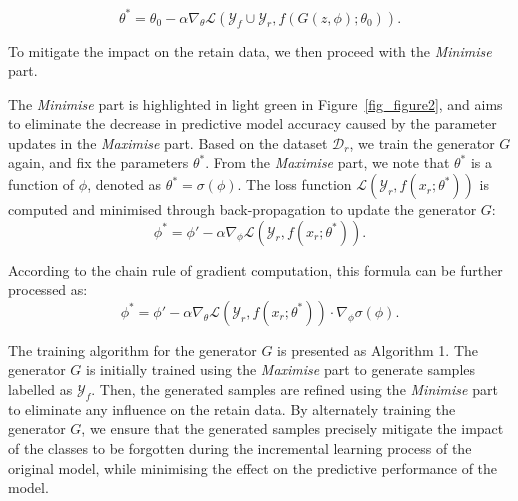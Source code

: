 \documentclass[preprint,12pt]{elsarticle}
\begin{document}
\begin{equation}
\theta^* = \theta_0 - \alpha \nabla_\theta \mathcal{L}(\mathcal{Y}_f \cup \mathcal{Y}_r, f(G(z, \phi); \theta_0)).
\end{equation}

To mitigate the impact on the retain data, we then proceed with the \textit{Minimise} part.

The \textit{Minimise} part is highlighted in light green in Figure~\ref{fig_figure2}, and aims to eliminate the decrease in predictive model accuracy caused by the parameter updates in the \textit{Maximise} part. Based on the dataset $\mathcal{D}_r$, we train the generator \(G\) again, and fix the parameters \(\theta^*\). From the \textit{Maximise} part,  we note that \(\theta^*\) is a function of \(\phi\), denoted as \(\theta^* = \sigma(\phi)\). The loss function \(\mathcal{L}(\mathcal{Y}_r, f(x_r; \theta^*))\) is computed and minimised through back-propagation to update the generator \(G\):
\begin{equation}
\phi^* = \phi' - \alpha \nabla_\phi \mathcal{L}(\mathcal{Y}_r, f(x_r; \theta^*)).
\end{equation}

According to the chain rule of gradient computation, this formula can be further processed as:
\begin{equation}
\phi^* = \phi' - \alpha \nabla_\theta \mathcal{L}(\mathcal{Y}_r, f(x_r; \theta^*)) \cdot \nabla_\phi \sigma(\phi).
\end{equation}

The training algorithm for the generator \(G\) is presented as Algorithm 1. The generator \(G\) is initially trained using the \textit{Maximise} part to generate samples labelled as \(\mathcal{Y}_f\). Then, the generated samples are refined using the \textit{Minimise} part to eliminate any influence on the retain data. By alternately training the generator \(G\), we ensure that the generated samples precisely mitigate the impact of the classes to be forgotten during the incremental learning process of the original model, while minimising the effect on the predictive performance of the model.
\end{document}
